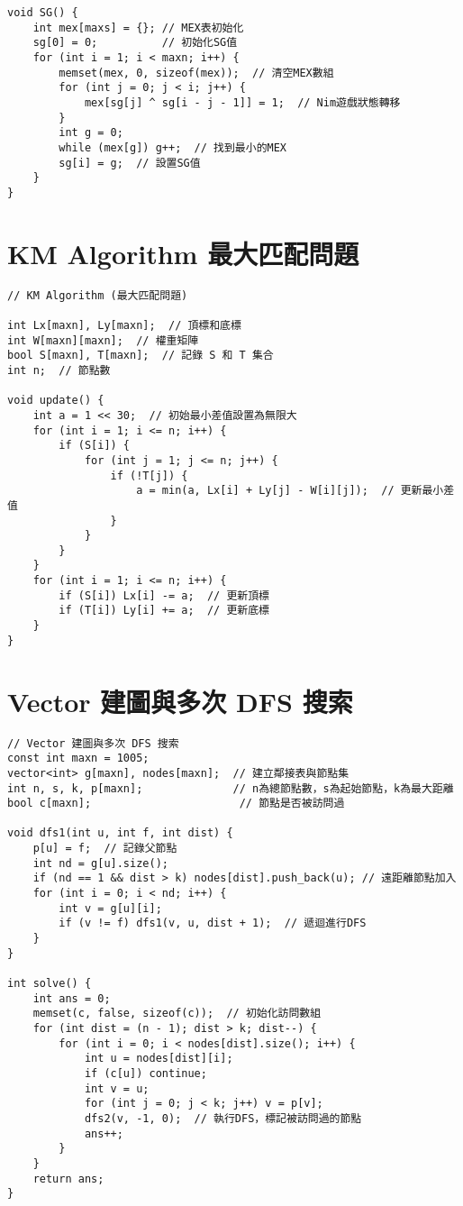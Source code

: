 \documentclass{article}
\begin{document}
\begin{multicols}{2}
\begin{lstlisting}
void SG() {
    int mex[maxs] = {}; // MEX表初始化
    sg[0] = 0;          // 初始化SG值
    for (int i = 1; i < maxn; i++) {
        memset(mex, 0, sizeof(mex));  // 清空MEX數組
        for (int j = 0; j < i; j++) {
            mex[sg[j] ^ sg[i - j - 1]] = 1;  // Nim遊戲狀態轉移
        }
        int g = 0;
        while (mex[g]) g++;  // 找到最小的MEX
        sg[i] = g;  // 設置SG值
    }
}
\end{lstlisting}

\section{KM Algorithm 最大匹配問題}

\begin{lstlisting}
// KM Algorithm (最大匹配問題)

int Lx[maxn], Ly[maxn];  // 頂標和底標
int W[maxn][maxn];  // 權重矩陣
bool S[maxn], T[maxn];  // 記錄 S 和 T 集合
int n;  // 節點數

void update() {
    int a = 1 << 30;  // 初始最小差值設置為無限大
    for (int i = 1; i <= n; i++) {
        if (S[i]) {
            for (int j = 1; j <= n; j++) {
                if (!T[j]) {
                    a = min(a, Lx[i] + Ly[j] - W[i][j]);  // 更新最小差值
                }
            }
        }
    }
    for (int i = 1; i <= n; i++) {
        if (S[i]) Lx[i] -= a;  // 更新頂標
        if (T[i]) Ly[i] += a;  // 更新底標
    }
}
\end{lstlisting}

\section{Vector 建圖與多次 DFS 搜索}

\begin{lstlisting}
// Vector 建圖與多次 DFS 搜索
const int maxn = 1005;
vector<int> g[maxn], nodes[maxn];  // 建立鄰接表與節點集
int n, s, k, p[maxn];              // n為總節點數，s為起始節點，k為最大距離
bool c[maxn];                       // 節點是否被訪問過

void dfs1(int u, int f, int dist) {
    p[u] = f;  // 記錄父節點
    int nd = g[u].size();
    if (nd == 1 && dist > k) nodes[dist].push_back(u); // 遠距離節點加入
    for (int i = 0; i < nd; i++) {
        int v = g[u][i];
        if (v != f) dfs1(v, u, dist + 1);  // 遞迴進行DFS
    }
}

int solve() {
    int ans = 0;
    memset(c, false, sizeof(c));  // 初始化訪問數組
    for (int dist = (n - 1); dist > k; dist--) {
        for (int i = 0; i < nodes[dist].size(); i++) {
            int u = nodes[dist][i];
            if (c[u]) continue;
            int v = u;
            for (int j = 0; j < k; j++) v = p[v];
            dfs2(v, -1, 0);  // 執行DFS，標記被訪問過的節點
            ans++;
        }
    }
    return ans;
}


\end{lstlisting}
\end{multicols}
\end{document}
